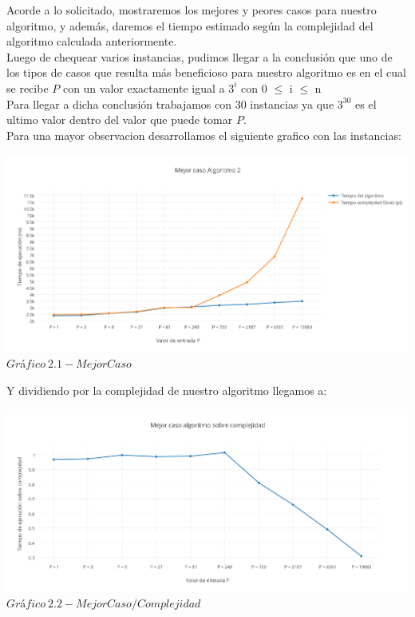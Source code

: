 \indent Acorde a lo solicitado, mostraremos los mejores y peores casos para nuestro algoritmo, y adem\'as, daremos el tiempo estimado 
seg\'un la complejidad del algoritmo calculada anteriormente.\\

Luego de chequear varios instancias, pudimos llegar a la conclusi\'on que uno de los tipos de casos que resulta m\'as beneficioso para nuestro algoritmo
es en el cual se recibe $P$ con un valor exactamente igual a $3^i$ con 0 $\leq$ i $\leq$ n \\

Para llegar a dicha conclusi\'on trabajamos con 30 instancias ya que $3^{30}$ es el ultimo valor dentro del valor que puede tomar $P$.\\

Para una mayor observacion desarrollamos el siguiente grafico con las instancias:\\

\vspace*{0.3cm} \vspace*{0.3cm}
  \begin{center}
 \includegraphics[scale=0.6]{./EJ2/mejorcaso.png}
 {$Gr$\'a$fico \ 2.1 - Mejor Caso$}
  \end{center}
  \vspace*{0.3cm}
  
Y dividiendo por la complejidad de nuestro algoritmo llegamos a:\\

\vspace*{0.3cm} \vspace*{0.3cm}
  \begin{center}
\includegraphics[scale=0.6]{./EJ2/mejorcaso2.png}
{$Gr$\'a$fico \ 2.2 - Mejor Caso / Complejidad$}
  \end{center}
  \vspace*{0.3cm}

